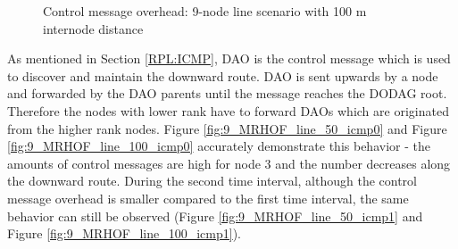 \begin{figure}[p]
  \begin{center}
    \leavevmode
    \caption{Control message overhead: 9-node line scenario with 100 m internode distance}
    \label{fig:9_MRHOF_line_100_icmp}
  \end{center}
   \vspace{-20pt}
\end{figure}

As mentioned in Section \ref{RPL:ICMP}, DAO is the control message which is used to discover and maintain the downward  route. DAO is sent upwards by a node and forwarded by the DAO parents until the message reaches the DODAG root. Therefore the nodes with lower rank have to forward DAOs which are originated from the higher rank nodes. Figure \ref{fig:9_MRHOF_line_50_icmp0} and Figure \ref{fig:9_MRHOF_line_100_icmp0} accurately demonstrate this behavior - the amounts of control messages are high for node 3 and the number decreases along the downward route. During the second time interval, although the control message overhead is smaller compared to the first time interval, the same behavior can still be observed (Figure \ref{fig:9_MRHOF_line_50_icmp1} and Figure \ref{fig:9_MRHOF_line_100_icmp1}). 


